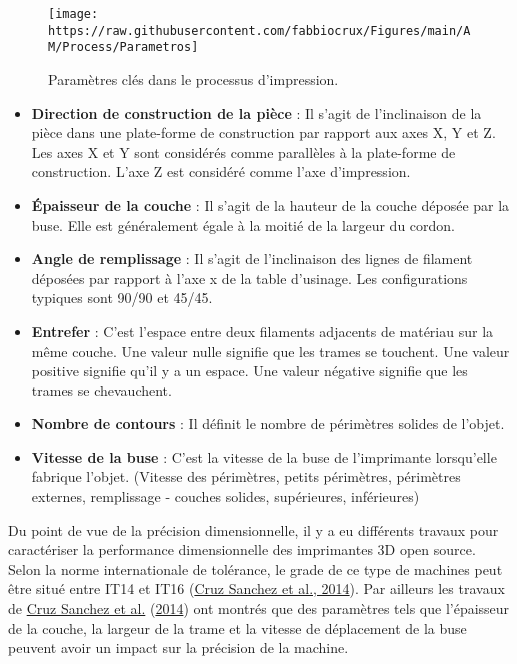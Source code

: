 \documentclass[
]{article}
\providecommand{\tightlist}{%
  \setlength{\itemsep}{0pt}\setlength{\parskip}{0pt}}
\begin{document}
\begin{figure}

{\centering \texttt{[image: https://raw.githubusercontent.com/fabbiocrux/Figures/main/AM/Process/Parametros]} 

}

\caption{Paramètres clés dans le processus d'impression.}\label{fig:parametros}
\end{figure}

\begin{itemize}
\tightlist
\item
  \textbf{Direction de construction de la pièce} : Il s'agit de l'inclinaison de la pièce dans une plate-forme de construction par rapport aux axes X, Y et Z. Les axes X et Y sont considérés comme parallèles à la plate-forme de construction. L'axe Z est considéré comme l'axe d'impression.
\item
  \textbf{Épaisseur de la couche} : Il s'agit de la hauteur de la couche déposée par la buse. Elle est généralement égale à la moitié de la largeur du cordon.
\item
  \textbf{Angle de remplissage} : Il s'agit de l'inclinaison des lignes de filament déposées par rapport à l'axe x de la table d'usinage. Les configurations typiques sont 90/90 et 45/45.
\item
  \textbf{Entrefer} : C'est l'espace entre deux filaments adjacents de matériau sur la même couche. Une valeur nulle signifie que les trames se touchent. Une valeur positive signifie qu'il y a un espace. Une valeur négative signifie que les trames se chevauchent.
\item
  \textbf{Nombre de contours} : Il définit le nombre de périmètres solides de l'objet.
\item
  \textbf{Vitesse de la buse} : C'est la vitesse de la buse de l'imprimante lorsqu'elle fabrique l'objet. (Vitesse des périmètres, petits périmètres, périmètres externes, remplissage - couches solides, supérieures, inférieures)
\end{itemize}

Du point de vue de la précision dimensionnelle, il y a eu différents travaux pour caractériser la performance dimensionnelle des imprimantes 3D open source. Selon la norme internationale de tolérance, le grade de ce type de machines peut être situé entre IT14 et IT16 (\protect\hyperlink{ref-CruzSanchez2014}{Cruz Sanchez et al., 2014}).
Par ailleurs les travaux de \protect\hyperlink{ref-CruzSanchez2014}{Cruz Sanchez et al.} (\protect\hyperlink{ref-CruzSanchez2014}{2014}) ont montrés que des paramètres tels que l'épaisseur de la couche, la largeur de la trame et la vitesse de déplacement de la buse peuvent avoir un impact sur la précision de la machine.
\end{document}
